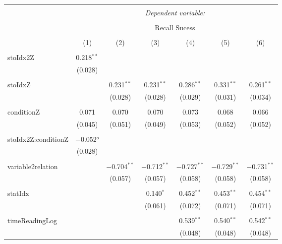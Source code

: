 
\begin{table}[!htbp] \centering 
  \caption{} 
  \label{} 
\begin{tabular}{@{\extracolsep{5pt}}lcccccc} 
\\[-1.8ex]\hline 
\hline \\[-1.8ex] 
 & \multicolumn{6}{c}{\textit{Dependent variable:}} \\ 
\cline{2-7} 
\\[-1.8ex] & \multicolumn{6}{c}{Recall Sucess} \\ 
\\[-1.8ex] & (1) & (2) & (3) & (4) & (5) & (6)\\ 
\hline \\[-1.8ex] 
 stoIdx2Z & 0.218$^{**}$ &  &  &  &  &  \\ 
  & (0.028) &  &  &  &  &  \\ 
  & & & & & & \\ 
 stoIdxZ &  & 0.231$^{**}$ & 0.231$^{**}$ & 0.286$^{**}$ & 0.331$^{**}$ & 0.261$^{**}$ \\ 
  &  & (0.028) & (0.028) & (0.029) & (0.031) & (0.034) \\ 
  & & & & & & \\ 
 conditionZ & 0.071 & 0.070 & 0.070 & 0.073 & 0.068 & 0.066 \\ 
  & (0.045) & (0.051) & (0.049) & (0.053) & (0.052) & (0.052) \\ 
  & & & & & & \\ 
 stoIdx2Z:conditionZ & $-$0.052$^{o}$ &  &  &  &  &  \\ 
  & (0.028) &  &  &  &  &  \\ 
  & & & & & & \\ 
 variable2relation &  & $-$0.704$^{**}$ & $-$0.712$^{**}$ & $-$0.727$^{**}$ & $-$0.729$^{**}$ & $-$0.731$^{**}$ \\ 
  &  & (0.057) & (0.057) & (0.058) & (0.058) & (0.058) \\ 
  & & & & & & \\ 
 statIdx &  &  & 0.140$^{*}$ & 0.452$^{**}$ & 0.453$^{**}$ & 0.454$^{**}$ \\ 
  &  &  & (0.061) & (0.072) & (0.071) & (0.071) \\ 
  & & & & & & \\ 
 timeReadingLog &  &  &  & 0.539$^{**}$ & 0.540$^{**}$ & 0.542$^{**}$ \\ 
  &  &  &  & (0.048) & (0.048) & (0.048) \\ 

\end{tabular}
\end{table}
